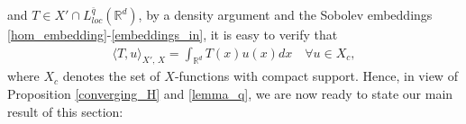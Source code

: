 \documentclass[letterpaper, 11pt,  reqno]{amsart}
\theoremstyle{definition}
\theoremstyle{remark}
\numberwithin{equation}{section}
\newcommand{\R}{{\mathbb R}}
\newcommand{\eps}{{\varepsilon}}
\begin{document}
and $T\in X{'}\cap L^{\bar{q}}_{loc}(\R^d)$,  by a density argument and the Sobolev embeddings \eqref{hom_embedding}-\eqref{embeddings_in}, it is easy to verify that
\begin{align}
\langle T, u \rangle_{ X{'}, \, X}=\int_{\R^d}T(x)u(x)dx\quad \forall u\in X_c,
\label{lemma_q}
\end{align}
where $X_{c}$ denotes the set of $X$-functions with compact support.  Hence, in view of Proposition \ref{converging_H} and \eqref{lemma_q}, we are now ready to state our main result of this section: 
\end{document}
